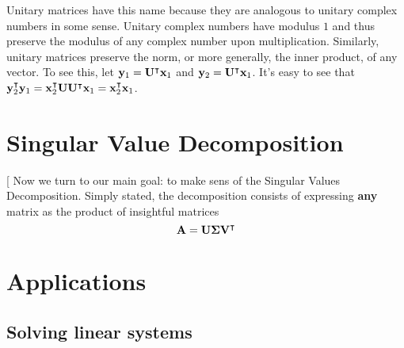 \documentclass{article}
\begin{document}
 Unitary matrices have this name because they are analogous to unitary complex numbers in some sense. Unitary complex numbers have modulus $1$ and thus preserve the modulus of any complex number upon multiplication. Similarly, unitary matrices preserve the norm, or more generally, the inner product, of any vector. To see this, let $\vb{y}_1 = \vb{U}^\intercal \vb{x}_1$ and $\vb{y}_2 = \vb{U}^\intercal \vb{x}_1$. It's easy to see that $\vb{y}_2^\intercal \vb{y}_1 = \vb{x}_2^\intercal \vb{U} \vb{U}^\intercal \vb{x}_1 = \vb{x}_2^\intercal\vb{x}_1$.

\section{Singular Value Decomposition}[
Now we turn to our main goal: to make sens of the Singular Values Decomposition. Simply stated, the decomposition consists of expressing \textbf{any} matrix as the product of insightful matrices
\begin{equation}
    \vb{A}=\vb{U}\boldsymbol{\Sigma}\vb{V}^\intercal
\end{equation}
\section{Applications}
\subsection{Solving linear systems}
\end{document}
